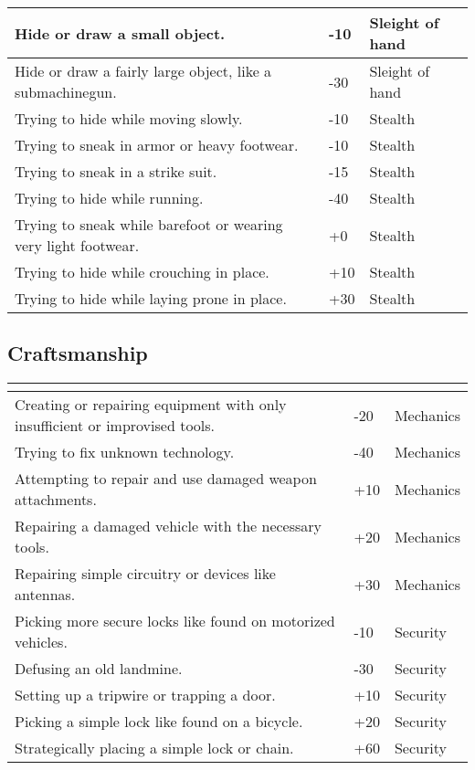 \documentclass[12pt,a4paper,openany]{book}
\newcommand{\ul}[1]{\underline{\smash{#1}}}
\begin{document}
\begin{tabularx}{\textwidth}{|X|l|l|}
		Hide or draw a small object. & -10 & Sleight of hand \\ \hline
		Hide or draw a fairly large object, like a submachinegun. & -30 & Sleight of hand \\ \hline
		Trying to hide while moving slowly. & -10 & Stealth \\ \hline
		Trying to sneak in armor or heavy footwear. & -10 & Stealth \\ \hline
		Trying to sneak in a strike suit. & -15 & Stealth \\ \hline
		Trying to hide while running. & -40 & Stealth \\ \hline
		Trying to sneak while barefoot or wearing very light footwear. & +0 & Stealth \\ \hline
		Trying to hide while crouching in place. & +10 & Stealth \\ \hline
		Trying to hide while laying prone in place. & +30 & Stealth \\ \hline
	\end{tabularx}
	\subsection{Craftsmanship}
	\begin{tabularx}{\textwidth}{|X|l|l|}
		\hline
		\ul{Situation} & \ul{Modifier} & \ul{Focused skill} \\ \hline
		Creating or repairing equipment with only insufficient or improvised tools. & -20 & Mechanics \\ \hline
		Trying to fix unknown technology. & -40 & Mechanics \\ \hline
		Attempting to repair and use damaged weapon attachments. & +10 & Mechanics \\ \hline
		Repairing a damaged vehicle with the necessary tools. & +20 & Mechanics \\ \hline
		Repairing simple circuitry or devices like antennas. & +30 & Mechanics \\ \hline
		Picking more secure locks like found on motorized vehicles. & -10 & Security \\ \hline
		Defusing an old landmine. & -30 & Security \\ \hline
		Setting up a tripwire or trapping a door. & +10 & Security \\ \hline
		Picking a simple lock like found on a bicycle. & +20 & Security \\ \hline
		Strategically placing a simple lock or chain. & +60 & Security \\ \hline
	\end{tabularx}
\end{document}
